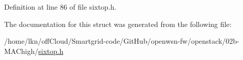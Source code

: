 Definition at line 86 of file sixtop.\+h.



The documentation for this struct was generated from the following file\+:\begin{DoxyCompactItemize}
\item 
/home/lkn/off\+Cloud/\+Smartgrid-\/code/\+Git\+Hub/openwsn-\/fw/openstack/02b-\/\+M\+A\+Chigh/\hyperlink{sixtop_8h}{sixtop.\+h}\end{DoxyCompactItemize}
